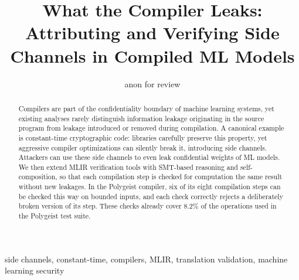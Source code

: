 \documentclass[conference]{IEEEtran}
\begin{document}
\title{What the Compiler Leaks: Attributing and Verifying Side Channels in Compiled ML Models\\
}
\author{anon for review}


\maketitle

\begin{abstract}
Compilers are part of the confidentiality
boundary of machine learning systems, yet existing analyses
rarely distinguish information leakage originating in the source
program from leakage introduced or removed during compilation. A canonical example is constant-time cryptographic code:
libraries carefully preserve this property, yet aggressive compiler
optimizations can silently break it, introducing side channels.
Attackers can use these side channels to even leak confidential
weights of ML models. 
We then extend MLIR verification tools with SMT-based reasoning
and self-composition, so that each compilation step is checked
for computation the same result without new leakages. In the
Polygeist compiler, six of its eight compilation steps can be
checked this way on bounded inputs, and each check correctly
rejects a deliberately broken version of its step. These checks already
cover 8.2\% of the operations used in the Polygeist test suite.
\end{abstract}

\begin{IEEEkeywords}
side channels, constant-time, compilers, MLIR, translation validation, machine learning security
\end{IEEEkeywords}
















\end{document}

